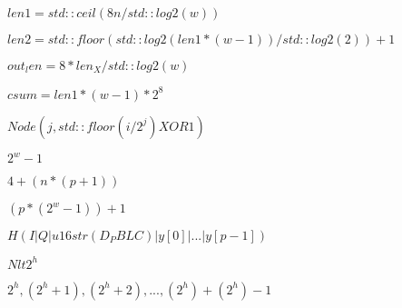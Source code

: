 \documentclass{article}
\begin{document}
$ len1 = std::ceil(8n/std::log2(w)) $
\pagebreak

$ len2 = std::floor(std::log2(len1 * (w-1))/std::log2(2)) + 1 $
\pagebreak

$ out_len = 8 * len_X / std::log2(w) $
\pagebreak

$ csum = len1 * (w - 1) * {2}^{8} $
\pagebreak

$ Node(j, std::floor(i/{2}^{j}) XOR 1) $
\pagebreak

$ {2}^{w} - 1 $
\pagebreak

$ 4 + (n * (p + 1)) $
\pagebreak

$ (p * ({2}^{w} - 1)) + 1 $
\pagebreak

$ H(I | Q | u16str(D_PBLC) | y[0] | ... | y[p-1]) $
\pagebreak

$ N lt {2}^{h} $
\pagebreak

$ {2}^{h}, ({2}^{h} + 1), ({2}^{h} + 2), ..., ({2}^{h})+({2}^{h})-1 $
\pagebreak
\end{document}
